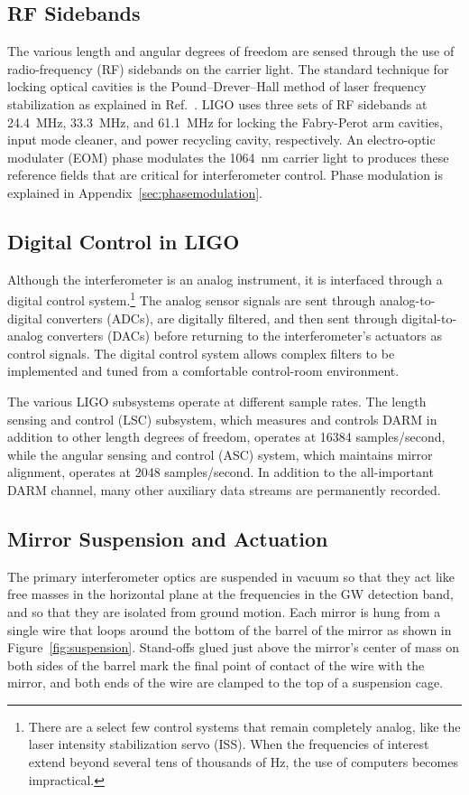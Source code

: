 \subsection{RF Sidebands}
The various length and angular degrees of freedom are sensed through
the use of radio-frequency (RF) sidebands on the carrier light.  The
standard technique for locking optical cavities is the
Pound--Drever--Hall method of laser frequency stabilization as
explained in Ref.~\cite{Black2001Introduction}. LIGO uses three sets
of RF sidebands at 24.4~MHz, 33.3~MHz, and 61.1~MHz for locking the
Fabry-Perot arm cavities, input mode cleaner, and power recycling
cavity, respectively. An electro-optic modulater (EOM) phase modulates
the 1064~nm carrier light to produces these reference fields that are
critical for interferometer control. Phase modulation is explained in
Appendix~\ref{sec:phasemodulation}.


\subsection{Digital Control in LIGO}
Although the interferometer is an analog instrument, it is interfaced
through a digital control system.\footnote{There are a select few
  control systems that remain completely analog, like the laser
  intensity stabilization servo (ISS). When the frequencies of
  interest extend beyond several tens of thousands of Hz, the use of
  computers becomes impractical.} The analog sensor signals are sent
through analog-to-digital converters (ADCs), are digitally filtered,
and then sent through digital-to-analog converters (DACs) before
returning to the interferometer's actuators as control signals. The
digital control system allows complex filters to be implemented and
tuned from a comfortable control-room environment.

The various LIGO subsystems operate at different sample rates.  The
length sensing and control (LSC) subsystem, which measures and
controls DARM in addition to other length degrees of freedom,
operates at 16384 samples/second, while the angular sensing and
control (ASC) system, which maintains mirror alignment, operates at
2048 samples/second.  In addition to the all-important DARM channel,
many other auxiliary data streams are permanently recorded.



\subsection{Mirror Suspension and Actuation}
\label{sec:suspension}
The primary interferometer optics are suspended in vacuum so that they
act like free masses in the horizontal plane at the frequencies in the
GW detection band, and so that they are isolated from ground
motion. Each mirror is hung from a single wire that loops around the
bottom of the barrel of the mirror as shown in
Figure~\ref{fig:suspension}. Stand-offs glued just above the mirror's
center of mass on both sides of the barrel mark the final point of
contact of the wire with the mirror, and both ends of the wire are
clamped to the top of a suspension cage.

